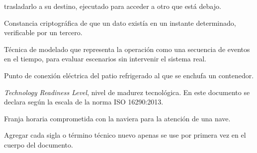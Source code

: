 \begin{description}[style=nextline, leftmargin=1.6cm]
    trasladarlo a su destino, ejecutado para acceder a otro que está debajo.
  \item[Sello de tiempo] Constancia criptográfica de que un dato existía en
    un instante determinado, verificable por un tercero.
  \item[Simulación de eventos discretos] Técnica de modelado que representa
    la operación como una secuencia de eventos en el tiempo, para evaluar
    escenarios sin intervenir el sistema real.
  \item[Toma] Punto de conexión eléctrica del patio refrigerado al que se
    enchufa un contenedor.
  \item[TRL] \emph{Technology Readiness Level}, nivel de madurez tecnológica.
    En este documento se declara según la escala de la norma ISO 16290:2013.
  \item[Ventana de atraque] Franja horaria comprometida con la naviera para
    la atención de una nave.
\end{description}

\vspace{4pt}
\noindent\small\textcolor{terabyteGris}{%
Agregar cada sigla o término técnico nuevo apenas se use por primera vez
en el cuerpo del documento.}
